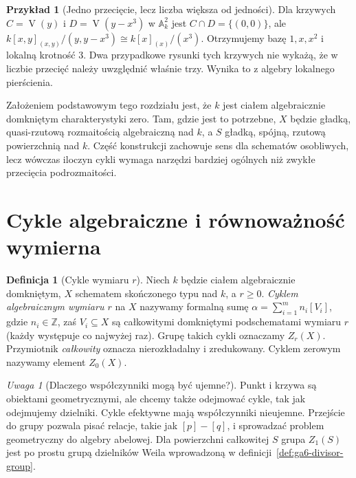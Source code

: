 \documentclass[11pt,a4paper,openany]{report}
\numberwithin{equation}{section}
\theoremstyle{plain}
\theoremstyle{definition}
\newtheorem{definicja}[twierdzenie]{Definicja}
\newtheorem{przyklad}[twierdzenie]{Przykład}
\theoremstyle{remark}
\newtheorem{uwaga}[twierdzenie]{Uwaga}
\newcommand{\Z}{\mathbb Z}
\newcommand{\A}{\mathbb A}
\newcommand{\V}{\operatorname V}
\begin{document}
\begin{przyklad}[Jedno przecięcie, lecz liczba większa od jedności]
Dla krzywych $C=\V(y)$ i $D=\V(y-x^3)$ w $\A^2_k$ jest
$C\cap D=\{(0,0)\}$, ale
$k[x,y]_{(x,y)}/(y,y-x^3)\cong k[x]_{(x)}/(x^3)$.
Otrzymujemy bazę $1,x,x^2$ i lokalną krotność $3$.
Dwa przypadkowe rysunki tych krzywych nie wykażą,
że w liczbie przecięć należy uwzględnić właśnie trzy.
Wynika to z algebry lokalnego pierścienia.
\end{przyklad}

Założeniem podstawowym tego rozdziału jest, że $k$ jest
ciałem algebraicznie domkniętym charakterystyki zero.
Tam, gdzie jest to potrzebne, $X$ będzie gładką,
quasi-rzutową rozmaitością algebraiczną nad $k$,
a $S$ gładką, spójną, rzutową powierzchnią nad $k$.
Część konstrukcji zachowuje sens dla schematów osobliwych,
lecz wówczas iloczyn cykli wymaga narzędzi bardziej ogólnych
niż zwykłe przecięcia podrozmaitości.

\section{Cykle algebraiczne i równoważność wymierna}
\label{sec:ga7-cycles}

\begin{definicja}[Cykle wymiaru $r$]
\label{def:ga7-cycles}
Niech $k$ będzie ciałem algebraicznie domkniętym,
$X$ schematem skończonego typu nad $k$, a $r\ge0$.
\emph{Cyklem algebraicznym wymiaru $r$} na $X$ nazywamy formalną
sumę $\alpha=\sum_{i=1}^m n_i[V_i]$, gdzie $n_i\in\Z$,
zaś $V_i\subseteq X$ są całkowitymi domkniętymi podschematami
wymiaru $r$ (każdy występuje co najwyżej raz).
Grupę takich cykli oznaczamy $Z_r(X)$.
Przymiotnik \emph{całkowity} oznacza nierozkładalny i zredukowany.
Cyklem zerowym nazywamy element $Z_0(X)$.
\end{definicja}

\begin{uwaga}[Dlaczego współczynniki mogą być ujemne?]
Punkt i krzywa są obiektami geometrycznymi, ale chcemy także
odejmować cykle, tak jak odejmujemy dzielniki.
Cykle efektywne mają współczynniki nieujemne.
Przejście do grupy pozwala pisać relacje, takie jak
$[p]-[q]$, i sprowadzać problem geometryczny do algebry abelowej.
Dla powierzchni całkowitej $S$ grupa $Z_1(S)$
jest po prostu grupą dzielników Weila wprowadzoną w
definicji~\ref{def:ga6-divisor-group}.
\end{uwaga}
\end{document}
